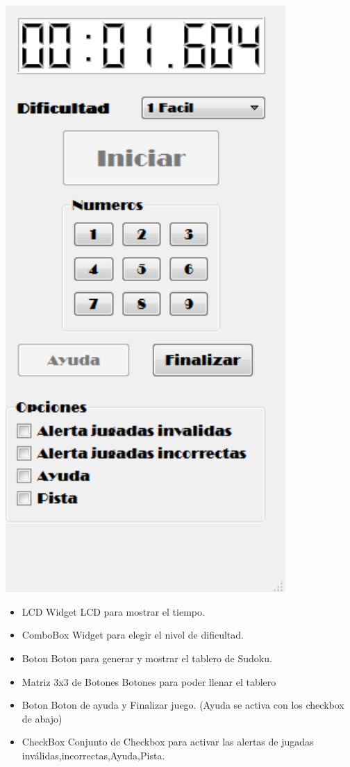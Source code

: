 \documentclass[12pt,oneside]{book}
\begin{document}
	\includegraphics[width=0.8\textwidth]{./imagenes/Panel_izquierdo.png}
		\begin{itemize}
			\item LCD
			Widget LCD para mostrar el tiempo. 
			\item ComboBox
			Widget para elegir el nivel de dificultad.
			\item Boton
			Boton para generar y mostrar el tablero de Sudoku.
			\item Matriz 3x3 de Botones
			Botones para poder llenar el tablero
			\item Boton
			Boton de ayuda y Finalizar juego. (Ayuda se activa con los checkbox de abajo)
			\item CheckBox
			Conjunto de Checkbox para activar las alertas de jugadas inválidas,incorrectas,Ayuda,Pista.
			\end {itemize}
	
\end{document}
